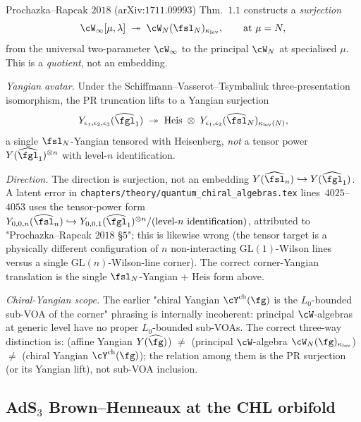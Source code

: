 \begin{theorem}
\label{wn:thm:second-pass-PR}

Prochazka--Rapcak $2018$ (arXiv:$1711.09993$) Thm.~$1.1$ constructs a
\emph{surjection}
\[
\cW_{\infty}[\mu, \lambda] \;\twoheadrightarrow\; \cW_N(\fsl_N)_{\kappa_{\mathrm{lev}}},
\qquad\text{at }\mu = N,
\]
from the universal two-parameter $\cW_{\infty}$ to the principal
$\cW_N$ at specialised $\mu$. This is a \emph{quotient}, not an
embedding.

\emph{Yangian avatar.} Under the Schiffmann--Vasserot--Tsymbaliuk
three-presentation isomorphism, the PR truncation lifts to a Yangian
surjection
\[
Y_{\epsilon_1, \epsilon_2, \epsilon_3}(\widehat{\fgl}_1)
\;\twoheadrightarrow\; \mathrm{Heis} \;\otimes\;
Y_{\epsilon_1, \epsilon_2}(\widehat{\fsl}_N)_{\kappa_{\mathrm{lev}}(N)},
\]
a single $\fsl_N$-Yangian tensored with Heisenberg, \emph{not} a
tensor power $Y(\widehat{\fgl}_1)^{\otimes n}$ with
level-$n$ identification.

\emph{Direction.} The direction is surjection, not an embedding
$Y(\widehat{\fsl}_n) \hookrightarrow Y(\widehat{\fgl}_1)$. A
latent error in
\texttt{chapters/theory/quantum\_chiral\_algebras.tex}
lines~$4025$--$4053$ uses the tensor-power form
$Y_{0, 0, n}(\widehat{\fsl}_n) \hookrightarrow
Y_{0, 0, 1}(\widehat{\fgl}_1)^{\otimes n} /
(\text{level-}n\text{ identification})$,
attributed to "Prochazka--Rapcak $2018$ \S$5$"; this is likewise wrong
(the tensor target is a physically different configuration of
$n$ non-interacting $\mathrm{GL}(1)$-Wilson lines versus a single
$\mathrm{GL}(n)$-Wilson-line corner). The correct corner-Yangian
translation is the single $\fsl_N$-Yangian + Heis form above.

\emph{Chiral-Yangian scope.} The earlier "chiral Yangian
$\cY^{\mathrm{ch}}(\fg)$ is the $L_0$-bounded sub-VOA of the corner"
phrasing is internally incoherent: principal $\cW$-algebras at generic
level have no proper $L_0$-bounded sub-VOAs. The correct three-way
distinction is:
(affine Yangian $Y(\widehat{\fg})$) $\neq$ (principal $\cW$-algebra
$\cW_N(\fg)_{\kappa_{\mathrm{lev}}}$) $\neq$ (chiral Yangian $\cY^{\mathrm{ch}}(\fg)$);
the relation among them is the PR surjection (or its Yangian lift),
not sub-VOA inclusion.
\end{theorem}

\subsection{AdS$_3$ Brown--Henneaux at the CHL orbifold}
\label{wn:subsec:second-pass-AdS3-BH}

